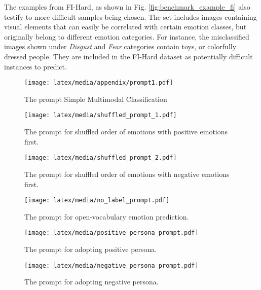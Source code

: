 The examples from FI-Hard, as shown in Fig. \ref{fig:benchmark_example_fi} also testify to more difficult samples being chosen. The set includes images containing visual elements that can easily be correlated with certain emotion classes, but originally belong to different emotion categories. For instance, the misclassified images shown under \textit{Disgust} and \textit{Fear} categories contain toys, or colorfully dressed people. They are included in the FI-Hard dataset as potentially difficult instances to predict. 

\begin{figure*}
    \centering
    \texttt{[image: latex/media/appendix/prompt1.pdf]}
    \caption{The prompt Simple Multimodal Classification}
    \label{fig:exp1_prompt}
\end{figure*}

\begin{figure*}
    \centering
    \texttt{[image: latex/media/shuffled\_prompt\_1.pdf]}
    \caption{The prompt for shuffled order of emotions with positive emotions first.}
    \label{fig:shuffled_prompt_1}
\end{figure*}

\begin{figure*}
    \centering
    \texttt{[image: latex/media/shuffled\_prompt\_2.pdf]}
    \caption{The prompt for shuffled order of emotions with negative emotions first.}
    \label{fig:shuffled_prompt_2}
\end{figure*}

\begin{figure*}
    \centering
    \texttt{[image: latex/media/no\_label\_prompt.pdf]}
    \caption{The prompt for open-vocabulary emotion prediction.}
    \label{fig:no_labeL_prompt}
\end{figure*}

\begin{figure*}
    \centering
    \texttt{[image: latex/media/positive\_persona\_prompt.pdf]}
    \caption{The prompt for adopting positive persona.}
    \label{fig:positive_persona_prompt}
\end{figure*}

\begin{figure*}
    \centering
    \texttt{[image: latex/media/negative\_persona\_prompt.pdf]}
    \caption{The prompt for adopting negative persona.}
    \label{fig:negative_persona_prompt}
\end{figure*}



